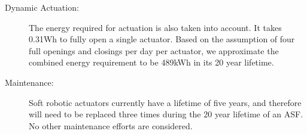 \begin{description}

\item[Dynamic Actuation: ] The energy required for actuation is also taken into account. It takes 0.31Wh to fully open a single actuator. Based on the assumption of four full openings and closings per day per actuator, we approximate the combined energy requirement to be 489kWh in its 20 year lifetime. 

\item[Maintenance: ] Soft robotic actuators currently have a lifetime of five years, and therefore will need to be replaced three times during the 20 year lifetime of an ASF. No other maintenance efforts are considered.


\end{description}
